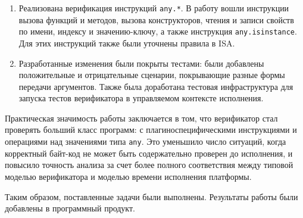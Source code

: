 \begin{enumerate}
    \item Реализована верификация инструкций \texttt{any.*}. В работу
    вошли инструкции вызова функций и методов, вызова конструкторов, чтения и
    записи свойств по имени, индексу и значению-ключу, а также инструкция
    \texttt{any.isinstance}. Для этих инструкций также 
    были уточнены правила в ISA.

    \item Разработанные изменения были покрыты тестами: были добавлены 
    положительные и отрицательные сценарии,
    покрывающие разные формы передачи аргументов.
    Также была доработана тестовая инфраструктура для запуска
    тестов верификатора в управляемом контексте исполнения.
\end{enumerate}

Практическая значимость работы заключается в том, что верификатор стал
проверять больший класс программ: с плагиноспецифическими инструкциями и операциями над
значениями типа \texttt{any}. Это уменьшило число ситуаций, когда корректный
байт-код не может быть содержательно проверен до исполнения, и
повысило точность анализа за счет более полного соответствия между типовой
моделью верификатора и моделью времени исполнения платформы.

Таким образом, поставленные задачи были выполнены. Результаты работы
были добавлены в программный продукт.
